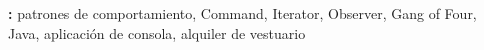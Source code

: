 %
%

{}
\noindent\textbf{\sectionTitleKeywords:} patrones de comportamiento, Command, Iterator, Observer, Gang of Four, Java, aplicación de consola, alquiler de vestuario
